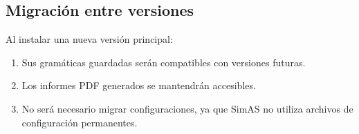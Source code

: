 \subsection{Migración entre versiones}

Al instalar una nueva versión principal:

\begin{enumerate}
    \item Sus gramáticas guardadas serán compatibles con versiones futuras.
    \item Los informes PDF generados se mantendrán accesibles.
    \item No será necesario migrar configuraciones, ya que SimAS no utiliza archivos de configuración permanentes.
\end{enumerate}
